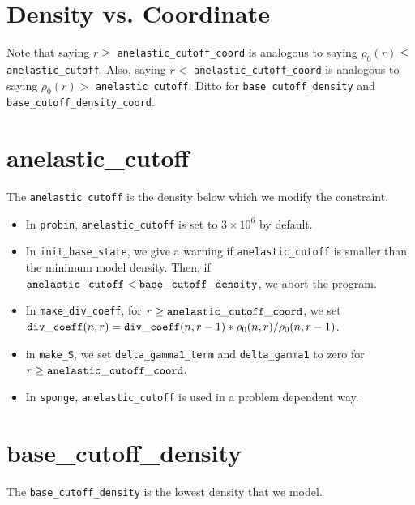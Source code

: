 \section{Density vs. Coordinate}

Note that saying $r\ge$ {\tt anelastic\_cutoff\_coord} is analogous to saying $\rho_0(r)\le$ {\tt anelastic\_cutoff}.  Also, saying $r<$ {\tt anelastic\_cutoff\_coord} is analogous to saying $\rho_0(r)>$ {\tt anelastic\_cutoff}.  Ditto for {\tt base\_cutoff\_density} and {\tt base\_cutoff\_density\_coord}.

\section{anelastic\_cutoff}\label{Sec:Anelastic Cutoff}

The {\tt anelastic\_cutoff} is the density below which we modify the constraint.


\begin{itemize}

\item In {\tt probin}, {\tt anelastic\_cutoff} is set to $3\times 10^6$ by default.

\item In {\tt init\_base\_state}, we give a warning if {\tt anelastic\_cutoff}
  is smaller than the minimum model density.  Then, if ${\tt anelastic\_cutoff} 
  < {\tt base\_cutoff\_density}$, we abort the program.

\item In {\tt make\_div\_coeff}, for 
  $r \ge {\tt anelastic\_cutoff\_coord}$, we set
  ${\tt div\_coeff}(n,r) = {\tt div\_coeff}(n,r-1) * \rho_0(n,r)/\rho_0(n,r-1)$.

\item in {\tt make\_S}, we set {\tt delta\_gamma1\_term} and {\tt delta\_gamma1} 
  to zero for $r \ge {\tt anelastic\_cutoff\_coord}$.

\item In {\tt sponge}, {\tt anelastic\_cutoff} is used in a problem
  dependent way.

\end{itemize}

\section{base\_cutoff\_density}\label{Sec:Base Cutoff Density}

The {\tt base\_cutoff\_density} is the lowest density that we model.

